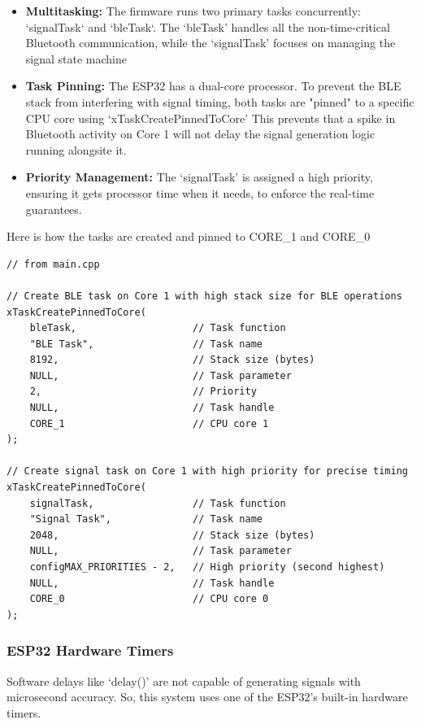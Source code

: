 \begin{itemize}
    \item \textbf{Multitasking:} The firmware runs two primary tasks concurrently: `signalTask` and `bleTask`. The `bleTask'
        handles all the non-time-critical Bluetooth communication, while the `signalTask' focuses on managing the signal 
        state machine
    \item \textbf{Task Pinning:} The ESP32 has a dual-core processor. To prevent the BLE stack from interfering with signal
        timing, both tasks are "pinned" to a specific CPU core using `xTaskCreatePinnedToCore' This prevents that a spike in 
        Bluetooth activity on Core 1 will not delay the signal generation logic running alongsite it.
    \item \textbf{Priority Management:} The `signalTask' is assigned a high priority, ensuring it gets processor time 
        when it needs, to enforce the real-time guarantees.
\end{itemize}

Here is how the tasks are created and pinned to CORE\_1 and CORE\_0

\begin{lstlisting}[caption={Example of FreeRTOS Task Creation}]
// from main.cpp

// Create BLE task on Core 1 with high stack size for BLE operations
xTaskCreatePinnedToCore(
    bleTask,                    // Task function
    "BLE Task",                 // Task name
    8192,                       // Stack size (bytes)
    NULL,                       // Task parameter
    2,                          // Priority
    NULL,                       // Task handle
    CORE_1                      // CPU core 1
);

// Create signal task on Core 1 with high priority for precise timing
xTaskCreatePinnedToCore(
    signalTask,                 // Task function
    "Signal Task",              // Task name
    2048,                       // Stack size (bytes)
    NULL,                       // Task parameter
    configMAX_PRIORITIES - 2,   // High priority (second highest)
    NULL,                       // Task handle
    CORE_0                      // CPU core 0
);
\end{lstlisting}

\subsubsection{ESP32 Hardware Timers}
Software delays like `delay()' are not capable of generating signals with microsecond accuracy. 
So, this system uses one of the ESP32's built-in hardware timers.

